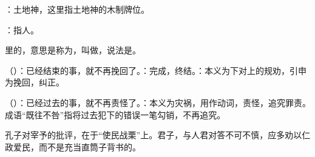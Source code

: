 {
\begin{lyblobitemize}
\item {}：土地神，这里指土地神的木制牌位。
\item {}：指人。
\item {}里的，意思是称为，叫做，说法是。
\item {}（）：已经结束的事，就不再挽回了。：完成，终结。：本义为下对上的规劝，引申为挽回，纠正。
\item {}（）：已经过去的事，就不再责怪了。：本义为灾祸，用作动词，责怪，追究罪责。成语“既往不咎”指将过去犯下的错误一笔勾销，不再追究。
\end{lyblobitemize}
孔子对宰予的批评，在于“使民战栗”上。君子，与人君对答不可不慎，应多劝以仁政爱民，而不是充当直筒子背书的。
}
{}


